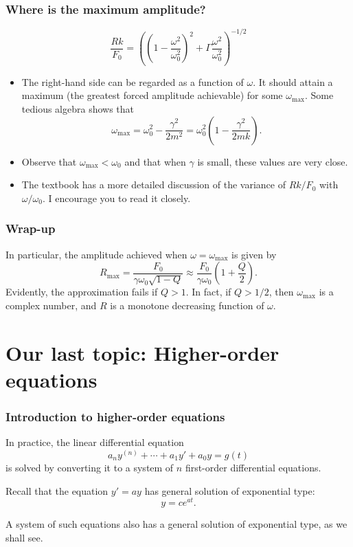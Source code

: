 \begin{frame}

\frametitle{Where is the maximum amplitude?}
\label{whereisthemaximumamplitude}

\[
    \frac{Rk}{F_0} = \left( \left( 1 - \frac{\omega^2}{\omega_0^2} \right)^2 + \Gamma \frac{\omega^2}{\omega_0^2} \right)^{-1/2}
\]

\begin{itemize}
\item The right-hand side can be regarded as a function of $ \omega $. It should attain a maximum (the greatest forced amplitude achievable) for some $ \omega_{\mathrm{max}} $. Some tedious algebra shows that
\[
\omega_{\mathrm{max}} = \omega_0^2 - \frac{\gamma^2}{2m^2} = \omega_0^2 \left( 1 - \frac{\gamma^2}{2mk} \right).
\]

\item Observe that $ \omega_{\mathrm{max}} < \omega_0 $ and that when $ \gamma $ is small, these values are very close.

\item The textbook has a more detailed discussion of the variance of $Rk/F_0$ with $\omega/\omega_0$. I encourage you to read it closely.

\end{itemize}

\end{frame}

\begin{frame}

\frametitle{Wrap-up}
\label{wrap-up}

In particular, the amplitude achieved when $ \omega = \omega_{\mathrm{max}} $ is given by
\[
    R_{\mathrm{max}} = \frac{F_0}{\gamma \omega_0 \sqrt{1-Q}} \approx \frac{F_0}{\gamma \omega_0} \left( 1 + \frac{Q}{2} \right).
\]
Evidently, the approximation fails if $ Q > 1 $. In fact, if $ Q > 1/2 $, then $ \omega_{\mathrm{max}} $ is a complex number, and $ R $ is a monotone decreasing function of $ \omega $.

\end{frame}

\section{Our last topic: Higher-order equations}
\label{ourlasttopic:higher-orderequations}

\begin{frame}

\frametitle{Introduction to higher-order equations}
\label{introductiontohigher-orderequations}

In practice, the linear differential equation
\[
    a_n y^{(n)} + \cdots + a_1 y' + a_0 y = g(t)
\]
is solved by converting it to a system of $ n $ first-order differential equations.

Recall that the equation $ y' = ay $ has general solution of exponential type:
\[
    y = ce^{at}.
\]

A system of such equations also has a general solution of exponential type, as we shall see.

\end{frame}

